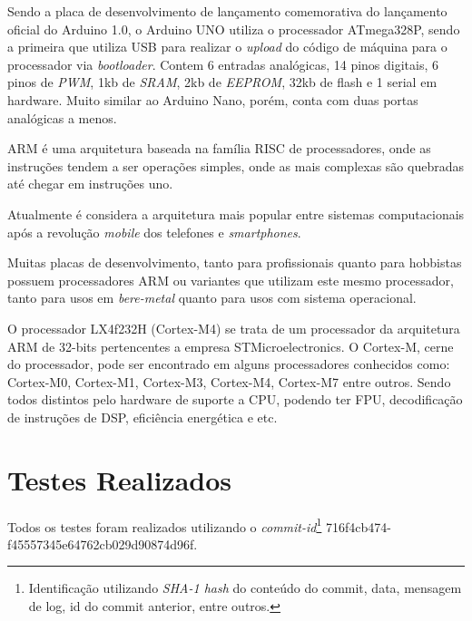 Sendo a placa de desenvolvimento de lançamento comemorativa do lançamento oficial do Arduino 1.0, o Arduino UNO utiliza o processador ATmega328P, sendo a primeira que utiliza USB para realizar o \textit{upload} do código de máquina para o processador via \textit{bootloader}. Contem 6 entradas analógicas, 14 pinos digitais, 6 pinos de \textit{PWM}, 1kb de \textit{SRAM}, 2kb de \textit{EEPROM}, 32kb de flash e 1 serial em hardware. Muito similar ao Arduino Nano, porém, conta com duas portas analógicas a menos.


ARM é uma arquitetura baseada na família RISC de processadores, onde as instruções tendem a ser operações simples, onde as mais complexas são quebradas até chegar em instruções uno.

Atualmente é considera a arquitetura mais popular entre sistemas computacionais após a revolução \textit{mobile} dos telefones e \textit{smartphones}.

Muitas placas de desenvolvimento, tanto para profissionais quanto para hobbistas possuem processadores ARM ou variantes que utilizam este mesmo processador, tanto para usos em \textit{bere-metal} quanto para usos com sistema operacional.


O processador LX4f232H (Cortex-M4) se trata de um processador da arquitetura ARM de 32-bits pertencentes a empresa STMicroelectronics. O Cortex-M, cerne do processador, pode ser encontrado em alguns processadores conhecidos como: Cortex-M0, Cortex-M1, Cortex-M3, Cortex-M4, Cortex-M7 entre outros. Sendo todos distintos pelo hardware de suporte a CPU, podendo ter FPU, decodificação de instruções de DSP, eficiência energética e etc.


\section{Testes Realizados}

Todos os testes foram realizados utilizando o \textit{commit-id}\footnote{Identificação utilizando \textit{SHA-1 hash} do conteúdo do commit, data, mensagem de log, id do commit anterior, entre outros.} 716f4cb474-\\f45557345e64762cb029d90874d96f.

